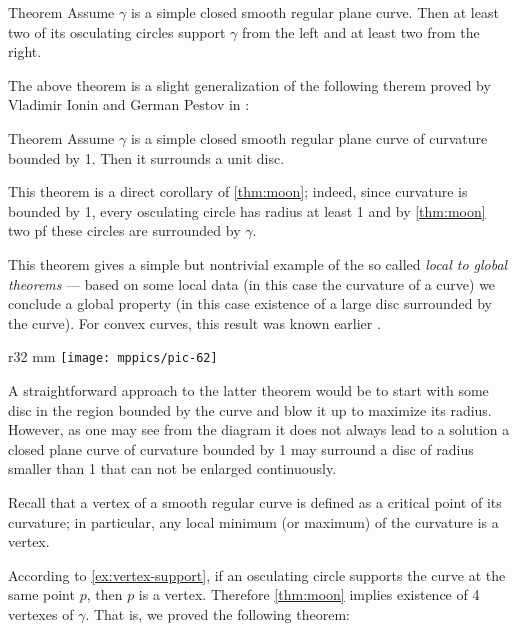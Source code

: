\begin{thm}{Theorem}\label{thm:moon}
Assume $\gamma$ is a simple closed smooth regular plane curve.
Then at least two of its osculating circles support $\gamma$ from the left and  at least two from the right.
\end{thm}


The above theorem is a slight generalization of the following therem proved by Vladimir Ionin and German Pestov in \cite{pestov-ionin}:

\begin{thm}{Theorem}\label{thm:moon-orginal}
Assume $\gamma$ is a simple closed smooth regular plane curve of curvature bounded by 1.
Then it surrounds a unit disc.
\end{thm}

This theorem is a direct corollary of \ref{thm:moon};
indeed, since curvature is bounded by 1, every osculating circle has radius at least 1 and by \ref{thm:moon} two pf these circles are surrounded by $\gamma$.

This theorem gives a simple but nontrivial example of the so called \emph{local to global theorems} --- based on some local data (in this case the curvature of a curve) we conclude a global property (in this case existence of a large disc surrounded by the curve).
For convex curves, this result was known earlier \cite[\S 24]{blaschke}.

\begin{wrapfigure}{r}{32 mm}
\vskip-0mm
\centering
\texttt{[image: mppics/pic-62]}
\vskip0mm
\end{wrapfigure}

A straightforward approach to the latter theorem would be to start with some disc in the region bounded by the curve and blow it up to maximize its radius.
However, as one may see from the diagram it does not always lead to a solution a closed plane curve of curvature bounded by 1 may surround a disc of radius smaller than 1 that can not be enlarged continuously.  

Recall that a vertex of a smooth regular curve is defined as a critical point of its curvature;
in particular, any local minimum (or maximum) of the curvature is a vertex.

According to \ref{ex:vertex-support}, if an osculating circle supports the curve at the same point $p$, then $p$ is a vertex.
Therefore \ref{thm:moon} implies existence of 4 vertexes of $\gamma$.
That is, we proved the following theorem:

